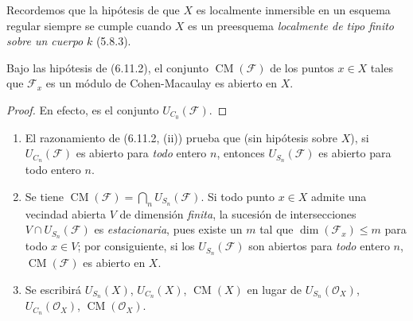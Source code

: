 Recordemos que la hipótesis de que $X$ es localmente inmersible en un esquema
regular siempre se cumple cuando $X$ es un preesquema \emph{localmente de
tipo finito sobre un cuerpo} $k$ (5.8.3).

\begin{corollary}[6.11.3]
\label{IV.2.s6.11.3-fr}
Bajo las hipótesis de \textup{(6.11.2)}, el conjunto $\operatorname{CM}(\mathcal F)$
de los puntos $x\in X$ tales que $\mathcal F_x$ es un módulo de
Cohen-Macaulay es abierto en $X$.
\end{corollary}

\begin{proof}
En efecto, es el conjunto $U_{C_0}(\mathcal F)$.
\end{proof}

\begin{remarks}[6.11.4]
\label{IV.2.s6.11.4-fr}
\begin{enumerate}
\item[(i)] El razonamiento de (6.11.2, (ii)) prueba que (sin hipótesis sobre
$X$), si $U_{C_n}(\mathcal F)$ es abierto para \emph{todo} entero $n$, entonces
$U_{S_n}(\mathcal F)$ es abierto para todo entero $n$.
\item[(ii)] Se tiene
$\operatorname{CM}(\mathcal F)=\bigcap_nU_{S_n}(\mathcal F)$. Si todo punto
$x\in X$ admite una vecindad abierta $V$ de dimensión \emph{finita}, la
sucesión de intersecciones $V\cap U_{S_n}(\mathcal F)$ es \emph{estacionaria},
pues existe un $m$ tal que $\dim(\mathcal F_x)\leq m$ para todo
$x\in V$; por consiguiente, si los $U_{S_n}(\mathcal F)$ son abiertos para \emph{todo}
entero $n$, $\operatorname{CM}(\mathcal F)$ es abierto en $X$.
\item[(iii)] Se escribirá $U_{S_n}(X)$, $U_{C_n}(X)$,
$\operatorname{CM}(X)$ en lugar de $U_{S_n}(\mathcal O_X)$,
$U_{C_n}(\mathcal O_X)$, $\operatorname{CM}(\mathcal O_X)$.
\end{enumerate}
\end{remarks}
